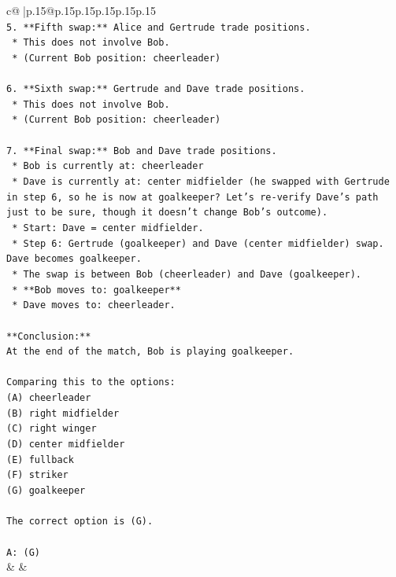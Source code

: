 \documentclass{article}
\begin{document}
{\begin{supertabular}{c@{$\;$}|p{.15\linewidth}@{}p{.15\linewidth}p{.15\linewidth}p{.15\linewidth}p{.15\linewidth}p{.15\linewidth}}
{{{\\ 
\texttt{5.  **Fifth swap:** Alice and Gertrude trade positions.} \\
\texttt{    *   This does not involve Bob.} \\
\texttt{    *   (Current Bob position: cheerleader)} \\
\\ 
\texttt{6.  **Sixth swap:** Gertrude and Dave trade positions.} \\
\texttt{    *   This does not involve Bob.} \\
\texttt{    *   (Current Bob position: cheerleader)} \\
\\ 
\texttt{7.  **Final swap:** Bob and Dave trade positions.} \\
\texttt{    *   Bob is currently at: cheerleader} \\
\texttt{    *   Dave is currently at: center midfielder (he swapped with Gertrude in step 6, so he is now at goalkeeper? Let's re{-}verify Dave's path just to be sure, though it doesn't change Bob's outcome).} \\
\texttt{        *   Start: Dave = center midfielder.} \\
\texttt{        *   Step 6: Gertrude (goalkeeper) and Dave (center midfielder) swap. Dave becomes goalkeeper.} \\
\texttt{    *   The swap is between Bob (cheerleader) and Dave (goalkeeper).} \\
\texttt{    *   **Bob moves to: goalkeeper**} \\
\texttt{    *   Dave moves to: cheerleader.} \\
\\ 
\texttt{**Conclusion:**} \\
\texttt{At the end of the match, Bob is playing goalkeeper.} \\
\\ 
\texttt{Comparing this to the options:} \\
\texttt{(A) cheerleader} \\
\texttt{(B) right midfielder} \\
\texttt{(C) right winger} \\
\texttt{(D) center midfielder} \\
\texttt{(E) fullback} \\
\texttt{(F) striker} \\
\texttt{(G) goalkeeper} \\
\\ 
\texttt{The correct option is (G).} \\
\\ 
\texttt{A: (G)} \\
            }
        }
    }
    & & \\ \\


\end{supertabular}}
\end{document}
